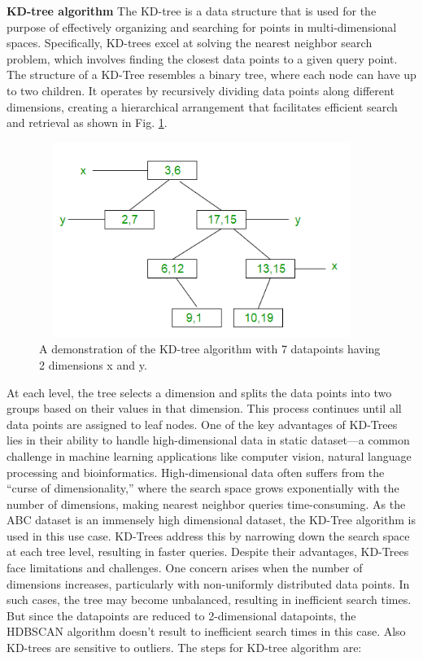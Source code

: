 \vspace{5mm}

\textbf{\ac{KD}-tree algorithm}
The \ac{KD}-tree is a data structure that is used for the purpose of effectively organizing and searching for points in multi-dimensional spaces. Specifically, \ac{KD}-trees excel at solving the nearest neighbor search problem, which involves finding the closest data points to a given query point. The structure of a \ac{KD}-Tree resembles a binary tree, where each node can have up to two children. It operates by recursively dividing data points along different dimensions, creating a hierarchical arrangement that facilitates efficient search and retrieval as shown in Fig. \ref{fig:kd_tree}. 
\begin{figure}[t]
    \centering
    \includegraphics[width=300pt,height=180pt]{pictures/ktree_1.png}
    \caption{A demonstration of the \ac{KD}-tree algorithm with 7 datapoints having 2 dimensions x and y.\cite{kd_tree}}
    \label{fig:kd_tree}
\end{figure} 
At each level, the tree selects a dimension and splits the data points into two groups based on their values in that dimension. This process continues until all data points are assigned to leaf nodes. One of the key advantages of \ac{KD}-Trees lies in their ability to handle high-dimensional data in static dataset—a common challenge in machine learning applications like computer vision, natural language processing and bioinformatics. High-dimensional data often suffers from the “curse of dimensionality,” where the search space grows exponentially with the number of dimensions, making nearest neighbor queries time-consuming. As the ABC \cite{Koch_2019_CVPR} dataset is an immensely high dimensional dataset, the \ac{KD}-Tree algorithm is used in this use case. \ac{KD}-Trees address this by narrowing down the search space at each tree level, resulting in faster queries. Despite their advantages, \ac{KD}-Trees face limitations and challenges. One concern arises when the number of dimensions increases, particularly with non-uniformly distributed data points. In such cases, the tree may become unbalanced, resulting in inefficient search times. But since the datapoints are reduced to 2-dimensional datapoints, the \ac{HDBSCAN} algorithm doesn't result to inefficient search times in this case. Also \ac{KD}-trees are sensitive to outliers. The steps for \ac{KD}-tree algorithm are:
